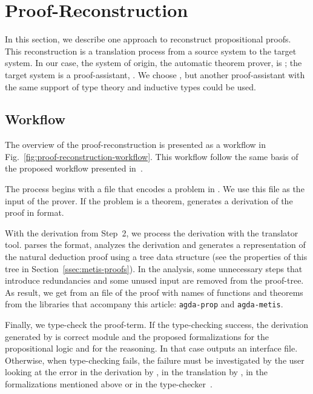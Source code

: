 \documentclass[../main.tex]{subfiles}
\begin{document}

\section{Proof-Reconstruction}
\label{sec:proof-reconstruction}

In this section, we describe one approach to reconstruct
propositional proofs. This reconstruction is a translation
process from a source system to the target system.
In our case, the system of origin, the automatic theorem prover, is
\Metis; the target system is a proof-assistant, \Agda. We choose
\Agda, but another proof-assistant with the same support of type
theory and inductive types could be used.

\subsection{Workflow}
\label{ssec:workflow}


The overview of the proof-reconstruction is presented as a workflow
in Fig.~\ref{fig:proof-reconstruction-workflow}. This workflow
follow the same basis of the proposed workflow presented
in~\cite{sultana2015}.

The process begins with a \TPTP file that encodes a problem in \CPL.
We use this file as the input of the \Metis prover. If the problem is
a theorem, \Metis generates a derivation of the proof in \TSTP
format.

With the \TSTP derivation from Step~2, we process the derivation with the
\Athena translator tool.
\Athena parses the \TSTP format, analyzes the
derivation and generates a representation of the natural deduction
proof using a tree data structure (see the properties
of this tree in Section~\ref{ssec:metis-proofs}).
In the \Athena analysis, some unnecessary steps that introduce redundancies
and some unused input are removed from the proof-tree.
As result, we get from \Athena an \Agda file of the proof
with names of functions and theorems from
the \Agda libraries that accompany this article:
\texttt{agda-prop} and \texttt{agda-metis}.

Finally, we type-check the \Agda proof-term. If the type-checking
success, the \TSTP derivation generated by \Metis is correct
module \Agda and the proposed formalizations for the
propositional logic and for the \Metis reasoning.
In that case \Agda outputs an interface file.
Otherwise, when type-checking fails, the failure must be
investigated by the user looking at the error in the \TSTP derivation
by \Metis, in the translation by \Athena, in the \Agda formalizations
mentioned above or in the type-checker~\Agda.
\end{document}
